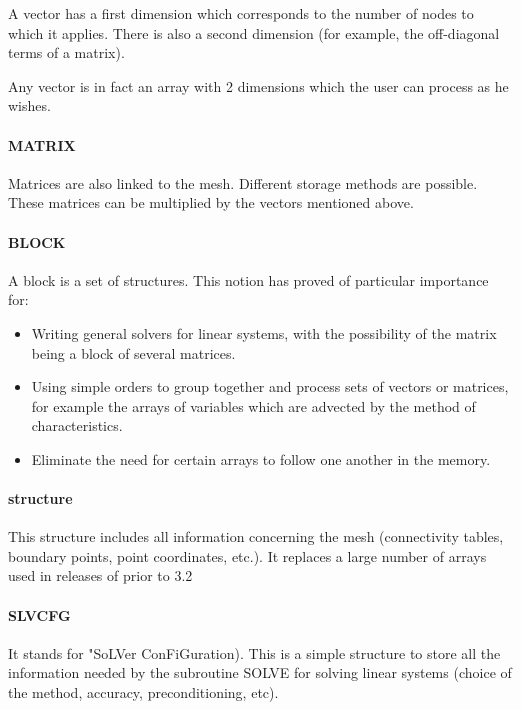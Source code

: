 A vector has a first dimension which corresponds to the number of nodes to
which it applies. There is also a second dimension (for example, the
off-diagonal terms of a matrix).

Any vector is in fact an array with 2 dimensions which the user can process as
he wishes.

\paragraph{MATRIX}

Matrices are also linked to the mesh. Different storage methods are possible.
These matrices can be multiplied by the vectors mentioned above.

\paragraph{BLOCK}

A block is a set of structures. This notion has proved of particular importance for:
\begin{itemize}
\item Writing general solvers for linear systems, with the possibility of the
  matrix being a block of several matrices.
\item Using simple orders to group together and process sets of vectors or
  matrices, for example the arrays of variables which are advected by the
  method of characteristics.
\item Eliminate the need for certain arrays to follow one another in the
  memory.
\end{itemize}

\paragraph{ structure}

This structure includes all information concerning the mesh (connectivity
tables, boundary points, point coordinates, etc.). It replaces a large number
of arrays used in releases of \bief prior to 3.2

\paragraph{SLVCFG}

It stands for "SoLVer ConFiGuration). This is a simple structure to store all
the information needed by the subroutine SOLVE for solving linear systems
(choice of the method, accuracy, preconditioning, etc).

